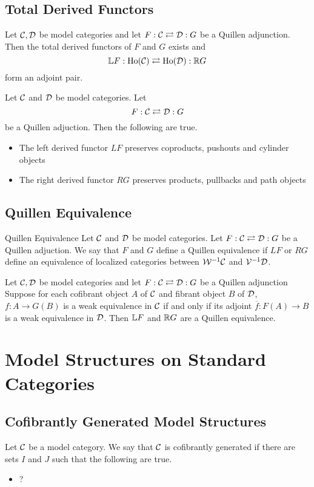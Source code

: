\documentclass[a4paper]{article}
\begin{document}
\subsection{Total Derived Functors}
\begin{thm}{}{} Let $\mathcal{C},\mathcal{D}$ be model categories and let $F:\mathcal{C}\rightleftarrows\mathcal{D}:G$ be a Quillen adjunction. Then the total derived functors of $F$ and $G$ exists and $$\mathbb{L} F:\text{Ho}(\mathcal{C})\rightleftarrows\text{Ho}(\mathcal{D}):\mathbb{R} G$$ form an adjoint pair. 
\end{thm}

\begin{prp}{}{} Let $\mathcal{C}$ and $\mathcal{D}$ be model categories. Let $$F:\mathcal{C}\rightleftarrows\mathcal{D}:G$$ be a Quillen adjuction. Then the following are true. 
\begin{itemize}
\item The left derived functor $LF$ preserves coproducts, pushouts and cylinder objects
\item The right derived functor $RG$ preserves products, pullbacks and path objects
\end{itemize}
\end{prp}

\subsection{Quillen Equivalence}
\begin{defn}{Quillen Equivalence}{} Let $\mathcal{C}$ and $\mathcal{D}$ be model categories. Let $F:\mathcal{C}\rightleftarrows\mathcal{D}:G$ be a Quillen adjuction. We say that $F$ and $G$ define a Quillen equivalence if $LF$ or $RG$ define an equivalence of localized categories between $\mathcal{W}^{-1}\mathcal{C}$ and $\mathcal{V}^{-1}\mathcal{D}$. 
\end{defn}

\begin{thm}{}{} Let $\mathcal{C},\mathcal{D}$ be model categories and let $F:\mathcal{C}\rightleftarrows\mathcal{D}:G$ be a Quillen adjunction Suppose for each cofibrant object $A$ of $\mathcal{C}$ and fibrant object $B$ of $\mathcal{D}$, $f:A\to G(B)$ is a weak equivalence in $\mathcal{C}$ if and only if its adjoint $\overline{f}:F(A)\to B$ is a weak equivalence in $\mathcal{D}$. Then $\mathbb{L} F$ and $\mathbb{R} G$ are a Quillen equivalence. 
\end{thm}

\pagebreak
\section{Model Structures on Standard Categories}
\subsection{Cofibrantly Generated Model Structures}
\begin{defn}{}{} Let $\mathcal{C}$ be a model category. We say that $\mathcal{C}$ is cofibrantly generated if there are sets $I$ and $J$ such that the following are true. 
\begin{itemize}
\item ?
\end{itemize}
\end{defn}
\end{document}
